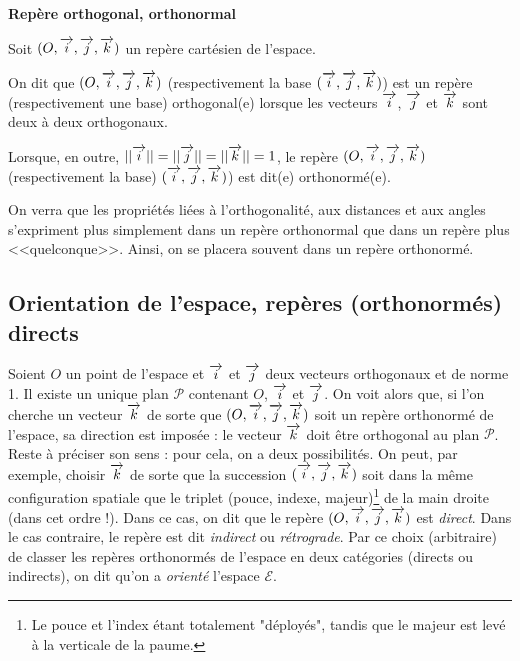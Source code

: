 \documentclass[10pt,oneside]{article}
\begin{document}
\begin{defi}
\textbf{Repère orthogonal, orthonormal}

Soit $(O,\overrightarrow{i}, \overrightarrow{j}, \overrightarrow{k})$ un repère cartésien de l'espace.

On dit que $(O,\overrightarrow{i}, \overrightarrow{j}, \overrightarrow{k})$ (respectivement la base $(\overrightarrow{i}, \overrightarrow{j}, \overrightarrow{k})$) est un repère (respectivement une base) orthogonal(e) lorsque les vecteurs $\overrightarrow{i}$, $\overrightarrow{j}$ et $\overrightarrow{k}$ sont deux à deux orthogonaux.

Lorsque, en outre, $||\overrightarrow{i}||=||\overrightarrow{j}||=||\overrightarrow{k}||=1$, le repère $(O, \overrightarrow{i}, \overrightarrow{j}, \overrightarrow{k})$ (respectivement la base) $(\overrightarrow{i}, \overrightarrow{j}, \overrightarrow{k})$) est dit(e) orthonormé(e).
\end{defi}


\begin{rem}

On verra que les propriétés liées à l'orthogonalité, aux distances et aux angles s'expriment plus simplement dans un repère orthonormal que dans un repère plus <<quelconque>>. Ainsi, on se placera souvent dans un repère orthonormé.
\end{rem}

\subsection{Orientation de l'espace, repères (orthonormés) directs}

Soient $O$ un point de l'espace et $\overrightarrow{i}$ et $\overrightarrow{j}$ deux vecteurs orthogonaux et de norme 1. Il existe un unique plan $\mathcal{P}$ contenant $O$, $\overrightarrow{i}$ et $\overrightarrow{j}$. On voit alors que, si l'on cherche un vecteur $\overrightarrow{k}$ de sorte que $(O, \overrightarrow{i}, \overrightarrow{j}, \overrightarrow{k})$ soit un repère orthonormé de l'espace, sa direction est imposée : le vecteur $\overrightarrow{k}$ doit être orthogonal au plan $\mathscr P$. Reste à préciser son sens : pour cela, on a deux possibilités. On peut, par exemple, choisir $\overrightarrow{k}$ de sorte que la succession $(\overrightarrow{i}, \overrightarrow{j}, \overrightarrow{k})$ soit dans la même configuration spatiale que le triplet (pouce, indexe, majeur)\footnote{Le pouce et l'index étant totalement "déployés", tandis que le majeur est levé à la verticale de la paume.} de la main droite (dans cet ordre !). Dans ce cas, on dit que le repère $(O, \overrightarrow{i}, \overrightarrow{j}, \overrightarrow{k})$ est \emph{direct}. Dans le cas contraire, le repère est dit \emph{indirect} ou \emph{rétrograde}. Par ce choix (arbitraire) de classer les repères orthonormés de l'espace en deux catégories (directs ou indirects), on dit qu'on a \emph{orienté} l'espace $\mathcal{E}$.
\end{document}
